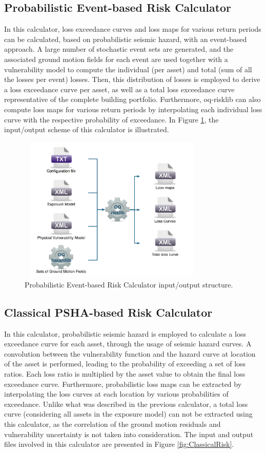 \subsection{Probabilistic Event-based Risk Calculator}
In this calculator, loss exceedance curves and loss maps for various return periods can be calculated, based on probabilistic seismic hazard, with an event-based approach. A large number of stochastic event sets are generated, and the associated ground motion fields for each event are used together with a vulnerability model to compute the individual (per asset) and total (sum of all the losses per event) losses. Then, this distribution of losses is employed to derive a loss exceedance curve per asset, as well as a total loss exceedance curve representative of the complete building portfolio. Furthermore, oq-risklib can also compute loss maps for various return periods by interpolating each individual loss curve with the respective probability of exceedance. In Figure \ref{fig:ProbEvent}, the input/output scheme of this calculator is illustrated.

\begin{figure}[ht]
\centering
\includegraphics[width=9cm,height=7cm]{figures/risk/ProbEvent.pdf}
\caption{Probabilistic Event-based Risk Calculator input/output structure.}
\label{fig:ProbEvent}
\end{figure}

\subsection{Classical PSHA-based Risk Calculator}
In this calculator, probabilistic seismic hazard is employed to calculate a loss exceedance curve for each asset, through the usage of seismic hazard curves. A convolution between the vulnerability function and the hazard curve at location of the asset is performed, leading to the probability of exceeding a set of loss ratios. Each loss ratio is multiplied by the asset value to obtain the final loss exceedance curve. Furthermore, probabilistic loss maps can be extracted by interpolating the loss curves at each location by various probabilities of exceedance. Unlike what was described in the previous calculator, a total loss curve (considering all assets in the exposure model) can not be extracted using this calculator, as the correlation of the ground motion residuals and vulnerability uncertainty is not taken into consideration. The input and output files involved in this calculator are presented in Figure \ref{fig:ClassicalRisk}.


